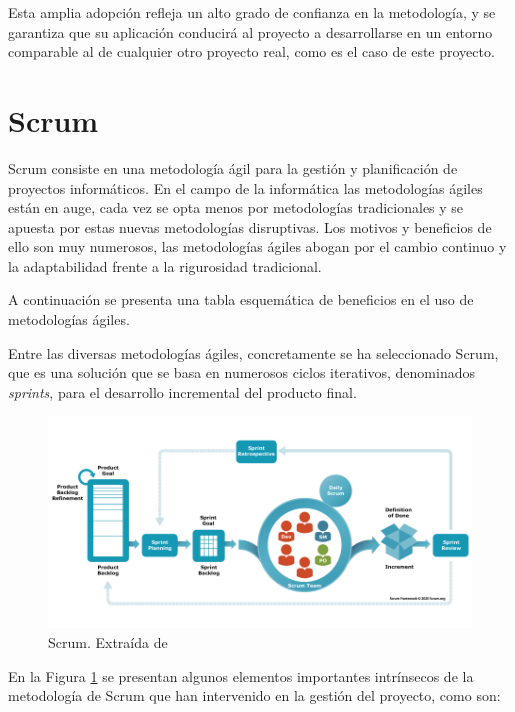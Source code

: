 Esta amplia adopción refleja un alto grado de confianza en la metodología, y se garantiza que su aplicación conducirá al proyecto a desarrollarse en un entorno comparable al de cualquier otro proyecto real, como es el caso de este proyecto.

\section{Scrum} \label{sec:04crum} %

Scrum \cite{scrumWebsite} consiste en una metodología ágil para la gestión y planificación de proyectos informáticos. En el campo de la informática las metodologías ágiles están en auge, cada vez se opta menos por metodologías tradicionales y se apuesta por estas nuevas metodologías disruptivas. Los motivos y beneficios de ello son muy numerosos, las metodologías ágiles abogan por el cambio continuo y la adaptabilidad frente a la rigurosidad tradicional. 

A continuación se presenta una tabla esquemática de beneficios en el uso de metodologías ágiles.



Entre las diversas metodologías ágiles, concretamente se ha seleccionado Scrum, que es una solución que se basa en numerosos ciclos iterativos, denominados \textit{sprints}, para el desarrollo incremental del producto final.

\begin{figure}[H]
    \centering
    \includegraphics[width=1\textwidth]{figures/scrumFramework.png}
     \caption{Scrum. Extraída de \cite{scrumWebsite}}
    \label{fig:scrumFramework}
\end{figure}

En la Figura \ref{fig:scrumFramework} se presentan algunos elementos importantes intrínsecos de la metodología de Scrum que han intervenido en la gestión del proyecto, como son:

